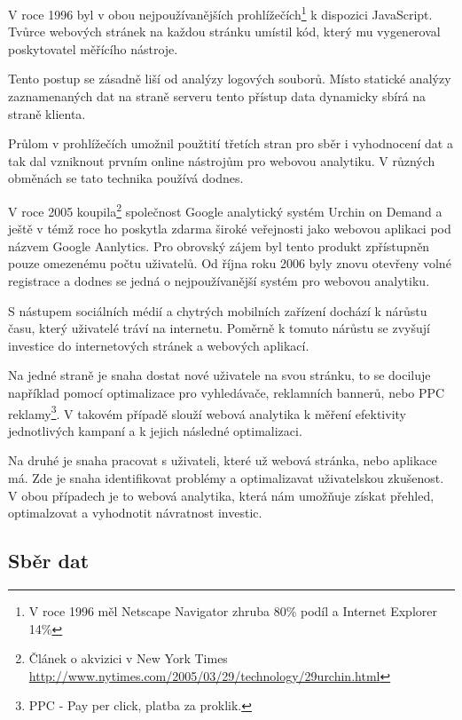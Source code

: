 \documentclass[bc,male,java,dept456]{diploma}						%
\begin{document}
V roce 1996 byl v obou nejpoužívanějších prohlížečích\footnote{V roce 1996 měl Netscape Navigator zhruba 80\% podíl a Internet Explorer 14\%} k dispozici JavaScript. Tvůrce webových stránek na každou stránku umístil kód, který mu vygeneroval poskytovatel měřícího nástroje. 

Tento postup se zásadně liší od analýzy logových souborů. Místo statické analýzy zaznamenaných dat na straně serveru tento přístup data dynamicky sbírá na straně klienta.

Průlom v prohlížečích umožnil použtití třetích stran pro sběr i vyhodnocení dat a tak dal vzniknout prvním online nástrojům pro webovou analytiku. V různých obměnách se tato technika používá dodnes.

V roce 2005 koupila\footnote{Článek o akvizici v New York Times \url{http://www.nytimes.com/2005/03/29/technology/29urchin.html}} společnost Google analytický systém Urchin on Demand a ještě v témž roce ho poskytla zdarma široké veřejnosti jako webovou aplikaci pod názvem Google Aanlytics. Pro obrovský zájem byl tento produkt zpřístupněn pouze omezenému počtu uživatelů. Od října roku 2006 byly znovu otevřeny volné registrace a dodnes se jedná o nejpoužívanější systém pro webovou analytiku.

S nástupem sociálních médií a chytrých mobilních zařízení dochází k nárůstu času, který uživatelé tráví na internetu. Poměrně k tomuto nárůstu se zvyšují investice do internetových stránek a webových aplikací. 

Na jedné straně je snaha dostat nové uživatele na svou stránku, to se dociluje na\-pří\-klad pomocí optimalizace pro vyhledávače, reklamních bannerů, nebo PPC reklamy\footnote{PPC - Pay per click, platba za proklik.}. V ta\-ko\-vém případě slouží webová analytika k měření efektivity jednotlivých kampaní a k jejich následné optimalizaci.

Na druhé je snaha pracovat s uživateli, které už webová stránka, nebo aplikace má. Zde je snaha identifikovat problémy a optimalizavat uživatelskou zkušenost. V obou případech je to webová analytika, která nám umožňuje získat přehled, optimalzovat a vyhodnotit návratnost investic.










\subsection{Sběr dat}
\end{document}
